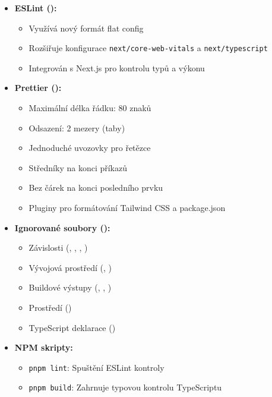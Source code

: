 \documentclass[12pt, a4paper]{article}
\begin{document}
\begin{itemize}
    \item \textbf{ESLint ():}
        \begin{itemize}
            \item Využívá nový formát flat config
            \item Rozšiřuje konfigurace \texttt{next/core-web-vitals} a \texttt{next/typescript}
            \item Integrován s Next.js pro kontrolu typů a výkonu
        \end{itemize}
    \item \textbf{Prettier ():}
        \begin{itemize}
            \item Maximální délka řádku: 80 znaků
            \item Odsazení: 2 mezery (taby)
            \item Jednoduché uvozovky pro řetězce
            \item Středníky na konci příkazů
            \item Bez čárek na konci posledního prvku
            \item Pluginy pro formátování Tailwind CSS a package.json
        \end{itemize}
    \item \textbf{Ignorované soubory ():}
        \begin{itemize}
            \item Závislosti (, , , )
            \item Vývojová prostředí (, )
            \item Buildové výstupy (, , )
            \item Prostředí ()
            \item TypeScript deklarace ()
        \end{itemize}
    \item \textbf{NPM skripty:}
        \begin{itemize}
            \item \texttt{pnpm lint}: Spuštění ESLint kontroly
            \item \texttt{pnpm build}: Zahrnuje typovou kontrolu TypeScriptu
        \end{itemize}
\end{itemize}
\end{document}
